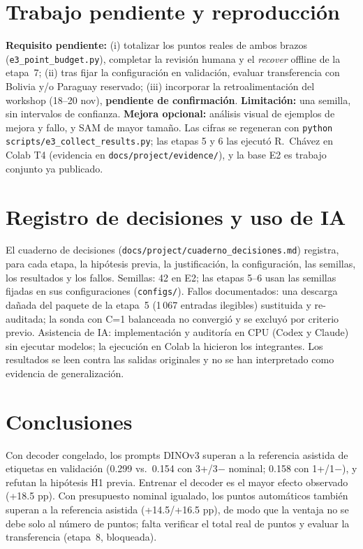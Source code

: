 \documentclass[11pt,twocolumn,a4paper]{article}
\begin{document}
\section{Trabajo pendiente y reproducci\'on}
\textbf{Requisito pendiente:} (i) totalizar los puntos reales de ambos brazos (\texttt{e3\_point\_budget.py}), completar la revisi\'on humana y el \emph{recover} offline de la etapa~7; (ii) tras fijar la configuraci\'on en validaci\'on, evaluar transferencia con Bolivia y/o Paraguay reservado; (iii) incorporar la retroalimentaci\'on del workshop (18--20 nov), \textbf{pendiente de confirmaci\'on}. \textbf{Limitaci\'on:} una semilla, sin intervalos de confianza. \textbf{Mejora opcional:} an\'alisis visual de ejemplos de mejora y fallo, y SAM de mayor tama\~no. Las cifras se regeneran con \texttt{python scripts/e3\_collect\_results.py}; las etapas 5 y 6 las ejecut\'o R.~Ch\'avez en Colab T4 (evidencia en \texttt{docs/project/evidence/}), y la base E2 es trabajo conjunto ya publicado.

\section{Registro de decisiones y uso de IA}
El cuaderno de decisiones (\texttt{docs/project/cuaderno\_decisiones.md}) registra, para cada etapa, la hip\'otesis previa, la justificaci\'on, la configuraci\'on, las semillas, los resultados y los fallos. Semillas: 42 en E2; las etapas 5--6 usan las semillas fijadas en sus configuraciones (\texttt{configs/}). Fallos documentados: una descarga da\~nada del paquete de la etapa~5 (1\,067 entradas ilegibles) sustituida y re-auditada; la sonda con C=1 balanceada no convergi\'o y se excluy\'o por criterio previo. Asistencia de IA: implementaci\'on y auditor\'ia en CPU (Codex y Claude) sin ejecutar modelos; la ejecuci\'on en Colab la hicieron los integrantes. Los resultados se leen contra las salidas originales y no se han interpretado como evidencia de generalizaci\'on.

\section{Conclusiones}
Con decoder congelado, los prompts DINOv3 superan a la referencia asistida de etiquetas en validaci\'on (0.299 vs.\ 0.154 con 3+/3$-$ nominal; 0.158 con 1+/1$-$), y refutan la hip\'otesis H1 previa. Entrenar el decoder es el mayor efecto observado (+18.5 pp). Con presupuesto nominal igualado, los puntos autom\'aticos tambi\'en superan a la referencia asistida (+14.5/+16.5 pp), de modo que la ventaja no se debe solo al n\'umero de puntos; falta verificar el total real de puntos y evaluar la transferencia (etapa~8, bloqueada).
\end{document}
